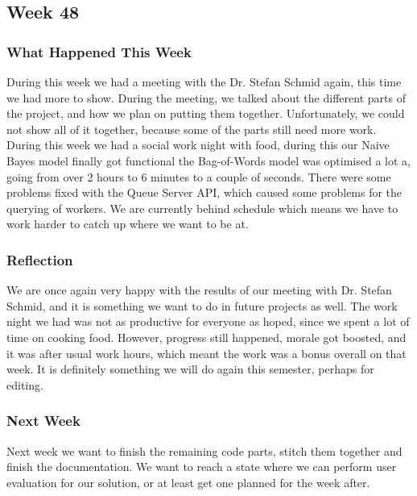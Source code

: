 \subsection{Week 48} 
\subsubsection{What Happened This Week}
During this week we had a meeting with the Dr. Stefan Schmid again, this time
we had more to show. During the meeting, we talked about the different parts of the
project, and how we plan on putting them together. Unfortunately, we could not
show all of it together, because some of the parts still need more work.
During this week we had a social work night with food, during this our Naive
Bayes model finally got functional the Bag-of-Words model was optimised a lot a,
going from over 2 hours to 6 minutes to a couple of seconds. There were some
problems fixed with the Queue Server \ac{API}, which caused some problems for
the querying of workers. We are currently behind schedule which means we have to
work harder to catch up where we want to be at.

\subsubsection{Reflection}
We are once again very happy with the results of our meeting with Dr. Stefan
Schmid, and it is something we want to do in future projects as well. The work
night we had was not as productive for everyone as hoped, since we spent a
lot of time on cooking food. However, progress still happened, morale got
boosted, and it was after usual work hours, which meant the work was a
bonus overall on that week. It is definitely something we will do again this
semester, perhaps for editing. 

\subsubsection{Next Week}
Next week we want to finish the remaining code parts, stitch them together and
finish the documentation. We want to reach a state where we can perform user
evaluation for our solution, or at least get one planned for the week after.


